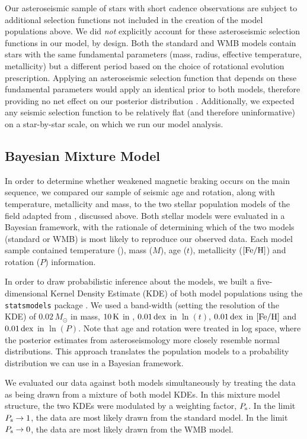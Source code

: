 Our asteroseismic sample of stars with short cadence observations are subject to additional selection functions not included in the creation of the model populations above. We did \textit{not} explicitly account for these asteroseismic selection functions in our model, by design. Both the standard and WMB models contain stars with the same fundamental parameters (mass, radius, effective temperature, metallicity) but a different period based on the choice of rotational evolution prescription. Applying an asteroseismic selection function that depends on these fundamental parameters would apply an identical prior to both models, therefore providing no net effect on our posterior distribution \cite{chaplin+2011}.  Additionally, we expected any seismic selection function to be relatively flat (and therefore uninformative) on a star-by-star scale, on which we run our model analysis. 

\subsection{Bayesian Mixture Model}
In order to determine whether weakened magnetic braking occurs on the main sequence, we compared our sample of seismic age and rotation, along with temperature, metallicity and mass, to the two stellar population models of the \kepler field adapted from \cite{vansaders+2019}, discussed above. Both stellar models were evaluated in a Bayesian framework, with the rationale of determining which of the two models (standard or WMB) is most likely to reproduce our observed data. Each model sample contained temperature (\teff), mass ($M$), age ($t$), metallicity ($\rm{[Fe/H]}$) and rotation ($P$) information.

In order to draw probabilistic inference about the models, we built a five-dimensional Kernel Density Estimate (KDE) of both model populations using the \texttt{statsmodels} package \cite{seabold+perktold2010}. We used a band-width (setting the resolution of the KDE) of $0.02\, M_\odot$ in mass, $10\, \rm K$ in \teff, $0.01\, \rm{dex}$ in $\ln(t)$, $0.01\, \rm{dex}$ in $\rm{[Fe/H]}$ and $0.01\, \rm{dex}$ in $\ln(P)$. Note that age and rotation were treated in log space, where the posterior estimates from asteroseismology more closely resemble normal distributions. This approach translates the population models to a probability distribution we can use in a Bayesian framework.

We evaluated our data against both models simultaneously by treating the data as being drawn from a mixture of both model KDEs. In this mixture model structure, the two KDEs were modulated by a weighting factor, $P_{\rm s}$. In the limit $P_{\rm s} \rightarrow 1$, the data are most likely drawn from the standard model. In the limit $P_{\rm s} \rightarrow 0$, the data are most likely drawn from the WMB model.

